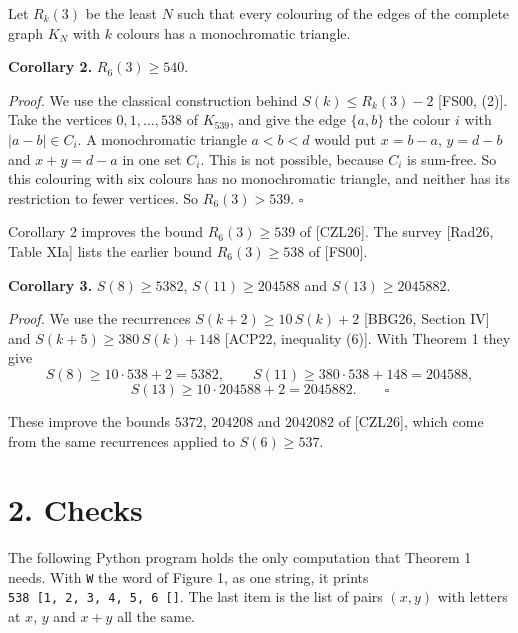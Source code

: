 \documentclass[
]{article}
\begin{document}
Let \(R_k(3)\) be the least \(N\) such that every colouring of the edges
of the complete graph \(K_N\) with \(k\) colours has a monochromatic
triangle.

\textbf{Corollary 2.} \(R_6(3)\ge 540\).

\emph{Proof.} We use the classical construction behind
\(S(k)\le R_k(3)-2\) {[}FS00, (2){]}. Take the vertices
\(0,1,\dots,538\) of \(K_{539}\), and give the edge \(\{a,b\}\) the
colour \(i\) with \(|a-b|\in C_i\). A monochromatic triangle \(a<b<d\)
would put \(x=b-a\), \(y=d-b\) and \(x+y=d-a\) in one set \(C_i\). This
is not possible, because \(C_i\) is sum-free. So this colouring with six
colours has no monochromatic triangle, and neither has its restriction
to fewer vertices. So \(R_6(3)>539\). \(\square\)

Corollary 2 improves the bound \(R_6(3)\ge 539\) of {[}CZL26{]}. The
survey {[}Rad26, Table XIa{]} lists the earlier bound \(R_6(3)\ge 538\)
of {[}FS00{]}.

\textbf{Corollary 3.} \(S(8)\ge 5382\), \(S(11)\ge 204588\) and
\(S(13)\ge 2045882\).

\emph{Proof.} We use the recurrences \(S(k+2)\ge 10\,S(k)+2\) {[}BBG26,
Section IV{]} and \(S(k+5)\ge 380\,S(k)+148\) {[}ACP22, inequality
(6){]}. With Theorem 1 they give
\[S(8)\ge 10\cdot 538+2=5382,\qquad S(11)\ge 380\cdot 538+148=204588,\]
\[S(13)\ge 10\cdot 204588+2=2045882. \qquad\square\]

These improve the bounds \(5372\), \(204208\) and \(2042082\) of
{[}CZL26{]}, which come from the same recurrences applied to
\(S(6)\ge 537\).

\section{2. Checks}\label{checks}

The following Python program holds the only computation that Theorem 1
needs. With \texttt{W} the word of Figure 1, as one string, it prints
\texttt{538\ {[}\textquotesingle{}1\textquotesingle{},\ \textquotesingle{}2\textquotesingle{},\ \textquotesingle{}3\textquotesingle{},\ \textquotesingle{}4\textquotesingle{},\ \textquotesingle{}5\textquotesingle{},\ \textquotesingle{}6\textquotesingle{}{]}\ {[}{]}}.
The last item is the list of pairs \((x,y)\) with letters at \(x\),
\(y\) and \(x+y\) all the same.
\end{document}
